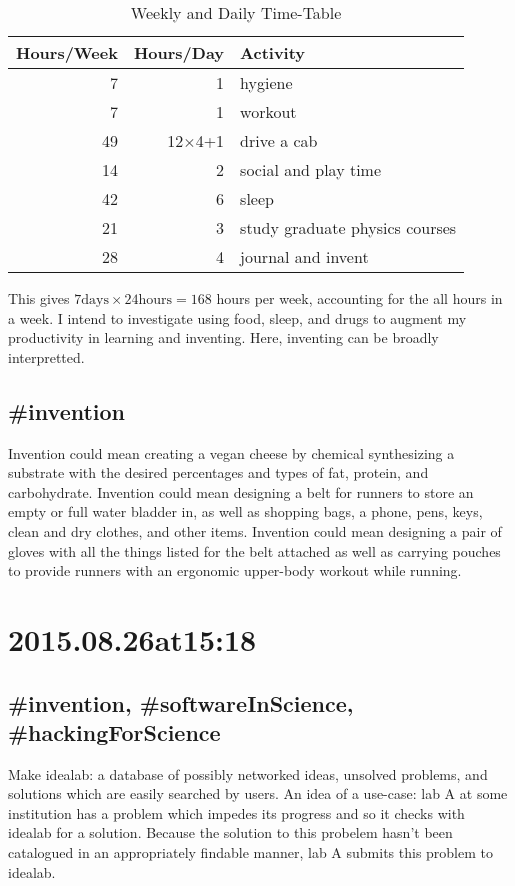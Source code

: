 \begin{enumerate}
\begin{table}
\caption{\label{tab:originalWeeklyAndDailyTimeTable}Weekly and Daily Time-Table}
\begin{tabular}{|r|r|l|}
\hline
Hours/Week&Hours/Day&Activity\\
\hline
7&1&hygiene\\
7&1&workout\\
49&12$\times$4+1&drive a cab\\
14&2&social and play time\\
42&6&sleep\\
21&3&study graduate physics courses\\
28&4&journal and invent\\
\hline
\end{tabular}\end{table}

This gives $7 \text{days} \times 24 \text{hours} = 168$ hours per week, accounting for the all hours in a week. I intend to investigate using food, sleep, and drugs to augment my productivity in learning and inventing. Here, inventing can be broadly interpretted.

\subsection*{\#invention}
Invention could mean creating a vegan cheese by chemical synthesizing a substrate with the desired percentages and types of fat, protein, and carbohydrate. Invention could mean designing a belt for runners to store an empty or full water bladder in, as well as shopping bags, a phone, pens, keys, clean and dry clothes, and other items. Invention could mean designing a pair of gloves with all the things listed for the belt attached as well as carrying pouches to provide runners with an ergonomic upper-body workout while running.

\section*{2015.08.26at15:18}
\subsection*{\#invention, \#softwareInScience, \#hackingForScience}
Make idealab: a database of possibly networked ideas, unsolved problems, and solutions which are easily searched by users. An idea of a use-case: lab A at some institution has a problem which impedes its progress and so it checks with idealab for a solution. Because the solution to this probelem hasn't been catalogued in an appropriately findable manner, lab A submits this problem to idealab.


\end{enumerate}

